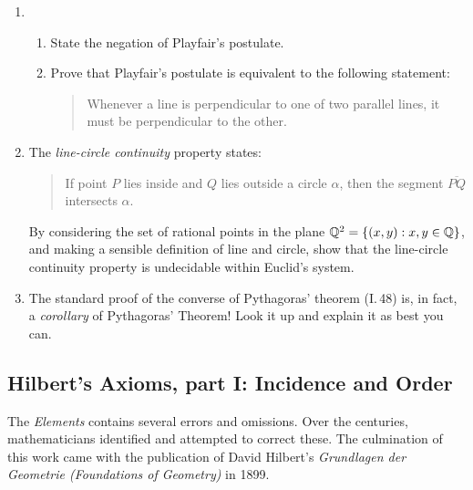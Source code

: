 \begin{exercises}
\begin{enumerate}
	  
	  \item\begin{enumerate}
	    \item State the negation of Playfair's postulate.
	    \item Prove that Playfair's postulate is equivalent to the following statement:
	  \begin{quote}
	  	Whenever a line is perpendicular to one of two parallel lines, it must be perpendicular to the other.
	  \end{quote}
	  \end{enumerate}
	 
	  
	  \item\label{ex:euclidundecideable} The \emph{line-circle continuity} property states:
	  \begin{quote}
	  If point $P$ lies inside and $Q$ lies outside a circle $\alpha$, then the segment $\overline{PQ}$ intersects $\alpha$.
	  \end{quote}
	  By considering the set of rational points in the plane $\mathbb{Q}^2=\{(x,y):x,y\in\mathbb{Q}\}$, and making a sensible definition of line and circle, show that the line-circle continuity property is undecidable within Euclid's system.
		
		
		\item The standard proof of the converse of Pythagoras' theorem (I.\,48) is, in fact, a \emph{corollary} of Pythagoras' Theorem! Look it up and explain it as best you can.
	\end{enumerate}
	
\end{exercises}

\clearpage



\subsection{Hilbert's Axioms, part I: Incidence and Order}\label{sec:hilbert1}

The \emph{Elements} contains several errors and omissions. Over the centuries, mathematicians identified and attempted to correct these. The culmination of this work came with the publication of David Hilbert's \emph{Grundlagen der Geometrie (Foundations of Geometry)} in 1899.\smallbreak


